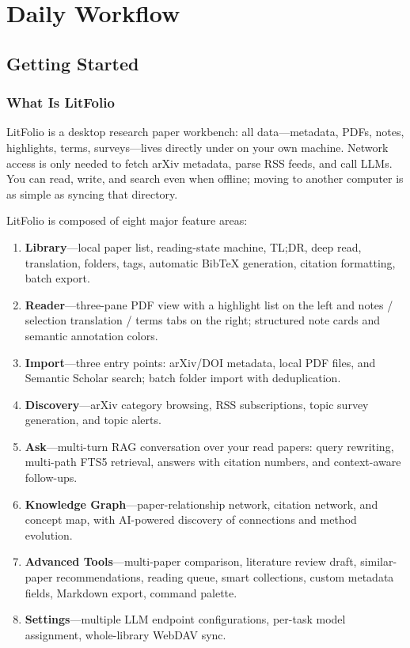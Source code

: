 \part{Daily Workflow}

\chapter{Getting Started}
\label{ch:start}

\section{What Is LitFolio}

LitFolio is a desktop research paper workbench:
all data---metadata, PDFs, notes, highlights, terms, surveys---lives directly under
 on your own machine. Network access is only
needed to fetch arXiv metadata, parse RSS feeds, and call LLMs. You
can read, write, and search even when offline; moving to another computer is as simple
as syncing that directory.

LitFolio is composed of eight major feature areas:

\begin{enumerate}
  \item \textbf{Library}---local paper list, reading-state machine, TL;DR, deep read,
    translation, folders, tags, automatic BibTeX generation, citation formatting,
    batch export.
  \item \textbf{Reader}---three-pane PDF view with a highlight list on the left and
    notes / selection translation / terms tabs on the right; structured note cards
    and semantic annotation colors.
  \item \textbf{Import}---three entry points: arXiv/DOI metadata, local PDF files,
    and Semantic Scholar search; batch folder import with deduplication.
  \item \textbf{Discovery}---arXiv category browsing, RSS subscriptions, topic survey
    generation, and topic alerts.
  \item \textbf{Ask}---multi-turn RAG conversation over your read papers: query
    rewriting, multi-path FTS5 retrieval, answers with citation numbers, and
    context-aware follow-ups.
  \item \textbf{Knowledge Graph}---paper-relationship network, citation network,
    and concept map, with AI-powered discovery of connections and method evolution.
  \item \textbf{Advanced Tools}---multi-paper comparison, literature review draft,
    similar-paper recommendations, reading queue, smart collections, custom metadata
    fields, Markdown export, command palette.
  \item \textbf{Settings}---multiple LLM endpoint configurations, per-task model
    assignment, whole-library WebDAV sync.
\end{enumerate}

